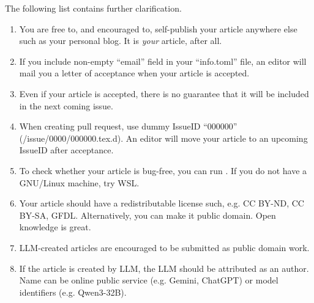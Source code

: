 The following list contains further clarification.

\begin{enumerate}
	\item You are free to, and encouraged to, self-publish your article anywhere else such as your personal blog.
	      It is \emph{your} article, after all.
	\item If you include non-empty ``email'' field in your ``info.toml'' file,
	      an editor will mail you a letter of acceptance when your article is accepted.
	\item Even if your article is accepted, there is no guarantee that it will be included in the next coming issue.
	\item When creating pull request, use dummy IssueID ``000000'' (/issue/0000/000000.tex.d).
	      An editor will move your article to an upcoming IssueID after acceptance.
	\item To check whether your article is bug-free, you can run .
	      If you do not have a GNU/Linux machine, try WSL.
	\item Your article should have a redistributable license such, e.g. CC BY-ND, CC BY-SA, GFDL.
	      Alternatively, you can make it public domain.
	      Open knowledge is great.
	\item LLM-created articles are encouraged to be submitted as public domain work.
	\item If the article is created by LLM, the LLM should be attributed as an author.
	      Name can be online public service (e.g. Gemini, ChatGPT)
	      or model identifiers (e.g. Qwen3-32B).
\end{enumerate}



